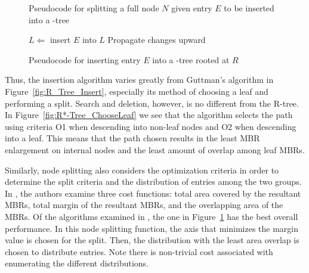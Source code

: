 \begin{figure}[b!]
\begin{algorithmic}
		\EndFor
	\EndFunction
\end{algorithmic}
\caption{Pseudocode for splitting a full node $N$ given entry $E$ to be inserted into 
	a \rstar-tree}
\label{fig:R*-Tree_Split}
\end{figure}

\begin{figure}[ht!]
\begin{algorithmic}
		\State $L\Leftarrow$ 
			\State insert $E$ into $L$
		\Else
				\State {}
			\Else
				\State {}
			\EndIf
		\EndIf
		\State Propagate changes upward
	\EndFunction
\end{algorithmic}
\caption{Pseudocode for inserting entry $E$ into a \rstar-tree rooted at $R$}
\label{fig:R*-Tree_Insert}
\end{figure}

Thus, the insertion algorithm varies greatly from Guttman's algorithm in 
Figure~\ref{fig:R_Tree_Insert}, especially its method of choosing a leaf and performing a 
split. Search and deletion, however, is no different from the R-tree. In 
Figure~\ref{fig:R*-Tree_ChooseLeaf} we see that the algorithm selects the path using criteria
O1 when descending into non-leaf nodes and O2 when descending into a leaf. This means that
the path chosen results in the least MBR enlargement on internal nodes and the least 
amount of overlap among leaf MBRs. 

Similarly, node splitting also considers the optimization criteria in order to determine
the split criteria and the distribution of entries among the two groups. In 
\cite{beckmannkriegelschneiderseeger90}, the authors examine three cost functions: total area 
covered by the resultant MBRs, total margin of the resultant MBRs, and the overlapping area 
of the MBRs. Of the algorithms examined in \cite{beckmannkriegelschneiderseeger90}, the one in 
Figure~\ref{fig:R*-Tree_Split} has the best overall performance. In this node splitting 
function, the axis that minimizes the margin value is chosen for the split. Then, the 
distribution with the least area overlap is chosen to distribute entries. Note there is 
non-trivial cost associated with enumerating the different distributions.

